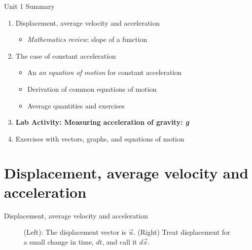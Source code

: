 \documentclass{beamer}
\begin{document}
\begin{frame}{Unit 1 Summary}
\begin{enumerate}
\item Displacement, average velocity and acceleration
\begin{itemize}
\item \textit{Mathematics review}: slope of a function
\end{itemize}
\item The case of constant acceleration
\begin{itemize}
\item An \textit{an equation of motion} for constant acceleration
\item Derivation of \alert{common equations of motion}
\item Average quantities and exercises
\end{itemize}
\item \textbf{Lab Activity: Measuring acceleration of gravity: \textit{g}}
\item Exercises with vectors, graphs, and equations of motion
\end{enumerate}
\end{frame}

\section{Displacement, average velocity and acceleration}

\begin{frame}{Displacement, average velocity and acceleration}
\begin{figure}
\centering
{}
\caption{\label{fig:displacement} (Left): The displacement vector is $\vec{u}$.  (Right) Treat displacement for a small change in time, $dt$, and call it $d\vec{x}$.}
\end{figure}
\end{frame}
\end{document}
